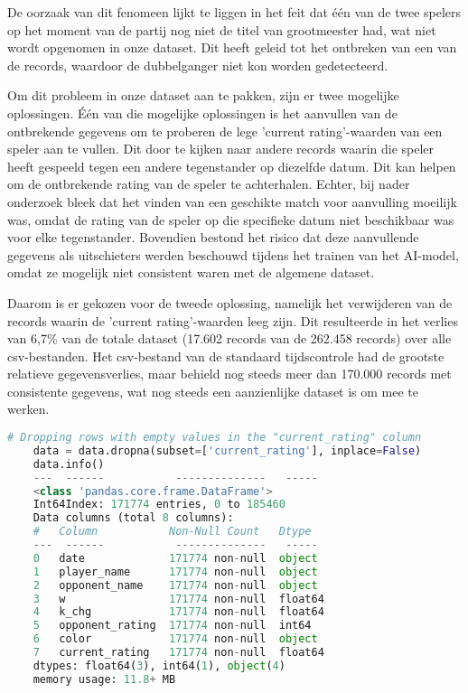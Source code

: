 De oorzaak van dit fenomeen lijkt te liggen in het feit dat één van de twee spelers op het moment van de partij nog niet de titel van grootmeester had, wat niet wordt opgenomen in onze dataset. Dit heeft geleid tot het ontbreken van een van de records, waardoor de dubbelganger niet kon worden gedetecteerd.

Om dit probleem in onze dataset aan te pakken, zijn er twee mogelijke oplossingen. Één van die mogelijke oplossingen is het aanvullen van de ontbrekende gegevens om te proberen de lege 'current rating'-waarden van een speler aan te vullen. Dit door te kijken naar andere records waarin die speler heeft gespeeld tegen een andere tegenstander op diezelfde datum. Dit kan helpen om de ontbrekende rating van de speler te achterhalen. Echter, bij nader onderzoek bleek dat het vinden van een geschikte match voor aanvulling moeilijk was, omdat de rating van de speler op die specifieke datum niet beschikbaar was voor elke tegenstander. Bovendien bestond het risico dat deze aanvullende gegevens als uitschieters werden beschouwd tijdens het trainen van het AI-model, omdat ze mogelijk niet consistent waren met de algemene dataset.

Daarom is er gekozen voor de tweede oplossing, namelijk het verwijderen van de records waarin de 'current rating'-waarden leeg zijn. Dit resulteerde in het verlies van 6,7\% van de totale dataset (17.602 records van de 262.458 records) over alle csv-bestanden. Het csv-bestand van de standaard tijdscontrole had de grootste relatieve gegevensverlies, maar behield nog steeds meer dan 170.000 records met consistente gegevens, wat nog steeds een aanzienlijke dataset is om mee te werken.

\begin{lstlisting}[language=Python]
    # Dropping rows with empty values in the "current_rating" column
    data = data.dropna(subset=['current_rating'], inplace=False)
    data.info()
    ---  ------           --------------   -----  
    <class 'pandas.core.frame.DataFrame'>
    Int64Index: 171774 entries, 0 to 185460
    Data columns (total 8 columns):
    #   Column           Non-Null Count   Dtype  
    ---  ------           --------------   -----  
    0   date             171774 non-null  object 
    1   player_name      171774 non-null  object 
    2   opponent_name    171774 non-null  object 
    3   w                171774 non-null  float64
    4   k_chg            171774 non-null  float64
    5   opponent_rating  171774 non-null  int64  
    6   color            171774 non-null  object 
    7   current_rating   171774 non-null  float64
    dtypes: float64(3), int64(1), object(4)
    memory usage: 11.8+ MB
\end{lstlisting}


